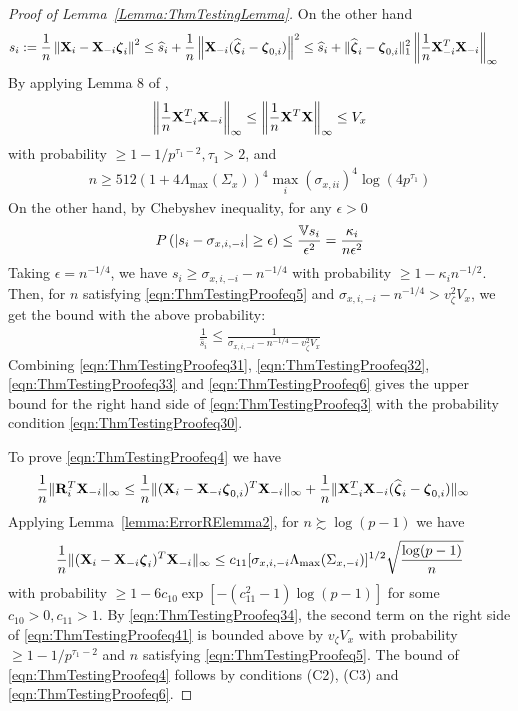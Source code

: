 \documentclass[12pt, letterpaper]{article}
\theoremstyle{definition}
\numberwithin{equation}{section}
\begin{document}
\begin{proof}[Proof of Lemma~\ref{Lemma:ThmTestingLemma}]
On the other hand
%
\begin{align*}
s_i := \frac{1}{n} \left\| {\mathbf{X}}_i - {\mathbf{X}}_{-i}  {\boldsymbol{\zeta}}_i \right\|^2 & \leq 
\widehat s_i + \frac{1}{n} \left\| {\mathbf{X}}_{-i} (\widehat {{\boldsymbol{\zeta}}}_i - {\boldsymbol{\zeta}}_{0,i} ) \right\|^2
\leq \widehat s_i + \| \widehat {{\boldsymbol{\zeta}}}_i - {\boldsymbol{\zeta}}_{0,i} \|_1^2 \left\| \frac{1}{n} {\mathbf{X}}_{-i}^T {\mathbf{X}}_{-i} \right\|_\infty
\end{align*}
%
By applying Lemma 8 of \cite{RavikumarEtal11},
%
\begin{align}\label{eqn:ThmTestingProofeq34}
\left\| \frac{1}{n} {\mathbf{X}}_{-i}^T {\mathbf{X}}_{-i} \right\|_\infty \leq
\left\| \frac{1}{n} {\mathbf{X}}^T {\mathbf{X}} \right\|_\infty \leq V_x
\end{align}
%
with probability $ \geq 1 - 1/p^{\tau_1-2}, \tau_1>2$, and
%
\begin{align}\label{eqn:ThmTestingProofeq5}
n \geq 512 ( 1 + 4 \Lambda_{\max} (\Sigma_{x}))^4 \max_i (\sigma_{x,ii} )^4 \log (4p^{\tau_1})
\end{align}
%
On the other hand, by Chebyshev inequality, for any $\epsilon>0$
%
$$
P\left( | s_i - \sigma_{x,i,-i}| \geq \epsilon \right) \leq \frac{{\mathbb{V}} s_i}{\epsilon^2} =
\frac{\kappa_i}{n \epsilon^2}
$$
%
Taking $\epsilon = n^{-1/4}$, we have $s_i \geq \sigma_{x,i,-i} - n^{-1/4}$ with probability $\geq 1 - \kappa_i n^{-1/2}$. Then, for $n$ satisfying \eqref{eqn:ThmTestingProofeq5} and $\sigma_{x,i,-i} - n^{-1/4} > v_\zeta^2 V_x$, we get the bound with the above probability:
%
\begin{align}\label{eqn:ThmTestingProofeq6}
\frac{1}{\widehat s_i} \leq \frac{1}{\sigma_{x,i,-i} - n^{-1/4} - v_\zeta^2 V_x}
\end{align}
%
Combining \eqref{eqn:ThmTestingProofeq31}, \eqref{eqn:ThmTestingProofeq32}, \eqref{eqn:ThmTestingProofeq33} and \eqref{eqn:ThmTestingProofeq6} gives the upper bound for the right hand side of \eqref{eqn:ThmTestingProofeq3} with the probability condition \eqref{eqn:ThmTestingProofeq30}.

To prove \eqref{eqn:ThmTestingProofeq4} we have
%
\begin{align}\label{eqn:ThmTestingProofeq41}
\frac{1}{n} \| {\mathbf{R}}_i^T {\mathbf{X}}_{-i} \|_\infty & \leq
\frac{1}{n} \| ({\mathbf{X}}_i - {\mathbf{X}}_{-i} {\boldsymbol{\zeta}}_{0,i})^T {\mathbf{X}}_{-i} \|_\infty +
\frac{1}{n} \| {\mathbf{X}}_{-i}^T {\mathbf{X}}_{-i} ( \widehat {{\boldsymbol{\zeta}}}_i - {\boldsymbol{\zeta}}_{0,i}) \|_\infty
\end{align}
%
Applying Lemma~\ref{lemma:ErrorRElemma2}, for $n \succsim \log(p-1)$ we have
%
%
\begin{align}
\frac{1}{n} \| ({\mathbf{X}}_i -  {\mathbf{X}}_{-i} {\boldsymbol{\zeta}}_i )^T {\mathbf{X}}_{-i} \|_\infty \leq 
c_{11} [ \sigma_{x,i,-i} \Lambda_{\max} (\Sigma_{x, -i}) ]^{1/2} \sqrt{\frac{ \log (p-1)}{n}}
\end{align}
%
with probability $\geq 1 - 6c_{10} \exp [-(c_{11}^2-1) \log (p-1)]$ for some $c_{10} >0, c_{11} > 1$. By \eqref{eqn:ThmTestingProofeq34}, the second term on the right side of \eqref{eqn:ThmTestingProofeq41} is bounded above by $v_\zeta V_x$ with probability $ \geq 1 - 1/p^{\tau_1-2}$ and $n$ satisfying \eqref{eqn:ThmTestingProofeq5}. The bound of \eqref{eqn:ThmTestingProofeq4} follows by conditions (C2), (C3) and \eqref{eqn:ThmTestingProofeq6}.
\end{proof}


%

\end{document}

